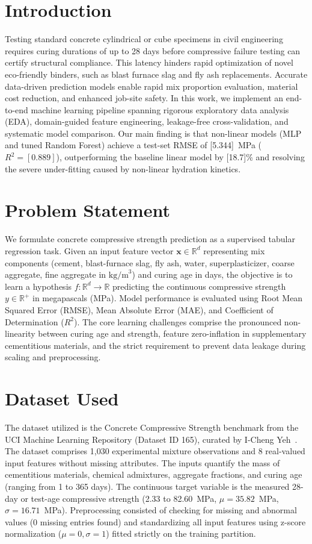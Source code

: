 \documentclass[conference]{IEEEtran}
\begin{document}
\section{Introduction}
Testing standard concrete cylindrical or cube specimens in civil engineering requires curing durations of up to 28 days before compressive failure testing can certify structural compliance. This latency hinders rapid optimization of novel eco-friendly binders, such as blast furnace slag and fly ash replacements. Accurate data-driven prediction models enable rapid mix proportion evaluation, material cost reduction, and enhanced job-site safety. In this work, we implement an end-to-end machine learning pipeline spanning rigorous exploratory data analysis (EDA), domain-guided feature engineering, leakage-free cross-validation, and systematic model comparison. Our main finding is that non-linear models (MLP and tuned Random Forest) achieve a test-set RMSE of [5.344]~MPa ($R^2 = [0.889]$), outperforming the baseline linear model by [18.7]\% and resolving the severe under-fitting caused by non-linear hydration kinetics.

\section{Problem Statement}
We formulate concrete compressive strength prediction as a supervised tabular regression task. Given an input feature vector $\mathbf{x} \in \mathbb{R}^d$ representing mix components (cement, blast-furnace slag, fly ash, water, superplasticizer, coarse aggregate, fine aggregate in $\text{kg/m}^3$) and curing age in days, the objective is to learn a hypothesis $f: \mathbb{R}^d \to \mathbb{R}$ predicting the continuous compressive strength $y \in \mathbb{R}^+$ in megapascals (MPa). Model performance is evaluated using Root Mean Squared Error (RMSE), Mean Absolute Error (MAE), and Coefficient of Determination ($R^2$). The core learning challenges comprise the pronounced non-linearity between curing age and strength, feature zero-inflation in supplementary cementitious materials, and the strict requirement to prevent data leakage during scaling and preprocessing.

\section{Dataset Used}
The dataset utilized is the Concrete Compressive Strength benchmark from the UCI Machine Learning Repository (Dataset ID 165), curated by I-Cheng Yeh~\cite{yeh1998}. The dataset comprises 1,030 experimental mixture observations and 8 real-valued input features without missing attributes. The inputs quantify the mass of cementitious materials, chemical admixtures, aggregate fractions, and curing age (ranging from 1 to 365 days). The continuous target variable is the measured 28-day or test-age compressive strength (2.33 to 82.60~MPa, $\mu = 35.82$~MPa, $\sigma = 16.71$~MPa). Preprocessing consisted of checking for missing and abnormal values (0 missing entries found) and standardizing all input features using z-score normalization ($\mu = 0, \sigma = 1$) fitted strictly on the training partition.
\end{document}
